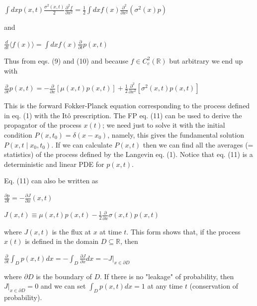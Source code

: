 \begin{DispWithArrows}[displaystyle, format=c]
  $\int d x p(x, t) \frac{\sigma^{2}(x, t)}{2} \frac{\partial^{2} f}{\partial x^{2}}=\frac{1}{2} \int d x f(x) \frac{\partial^{2}}{\partial x^{2}}\left(\sigma^{2}(x) p\right)$
\end{DispWithArrows}
and
\begin{DispWithArrows}[displaystyle, format=c]
  $\frac{d}{d t}\langle f(x)\rangle=\int d x f(x) \frac{\partial}{\partial t} p(x, t)$
\end{DispWithArrows}
Thus from eqs. (9) and (10) and because $f \in C_{c}^{2}(\mathbb{R})$ but
arbitrary we end up with
\begin{DispWithArrows}[displaystyle, format=c]
  $\frac{\partial}{\partial t} p(x, t)=-\frac{\partial}{\partial x}[\mu(x, t) p(x, t)]+\frac{1}{2} \frac{\partial^{2}}{\partial x^{2}}\left[\sigma^{2}(x, t) p(x, t)\right]$
\end{DispWithArrows}
This is the forward Fokker-Planck equation corresponding to the process defined
in eq. (1) with the Itô prescription. The FP eq. (11) can be used to derive the
propagator of the process $x(t)$; we need just to solve it with the initial
condition $P\left(x, t_{0}\right)=\delta\left(x-x_{0}\right)$, namely, this
gives the fundamental solution $P\left(x, t \mid x_{0}, t_{0}\right)$. If we can
calculate $P(x, t)$ then we can find all the averages (= statistics) of the
process defined by the Langevin eq. (1). Notice that eq. (11) is a deterministic
and linear PDE for $p(x, t)$.

Eq. (11) can also be written as
\begin{DispWithArrows}[displaystyle, format=c]
  $\frac{\partial p}{\partial t}=-\frac{\partial J}{\partial x}(x, t)$
\end{DispWithArrows}
\begin{DispWithArrows}[displaystyle, format=c]
  $J(x, t) \equiv \mu(x, t) p(x, t)-\frac{1}{2} \frac{\partial}{\partial x} \sigma(x, t) p(x, t)$
\end{DispWithArrows}
where $J(x, t)$ is the flux at $x$ at time $t$. This form shows that, if the
process $x(t)$ is defined in the domain $D \subseteq \mathbb{R}$, then
\begin{DispWithArrows}[displaystyle, format=c]
  $\frac{\partial}{\partial t} \int_{D} p(x, t) d x=-\int_{D} \frac{\partial J}{\partial x} d x=-\left.J\right|_{x \in \partial D}$
\end{DispWithArrows}
where $\partial D$ is the boundary of $D$. If there is no "leakage" of
probability, then $\left.J\right|_{x \in \partial D}=0$ and we can set
$\int_{D} p(x, t) d x=1$ at any time $t$ (conservation of probability).


